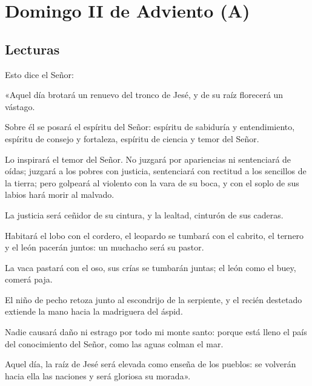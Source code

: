 \chapter{Domingo II de Adviento (A)}

\section{Lecturas}


 


\begin{scripture}
	
	Esto dice el Señor:
	
	«Aquel día brotará un renuevo del tronco de Jesé, y de su raíz florecerá un vástago.
	
	Sobre él se posará el espíritu del Señor: espíritu de sabiduría y entendimiento, espíritu de consejo y fortaleza, espíritu de ciencia y temor del Señor.
	
	Lo inspirará el temor del Señor. No juzgará por apariencias ni sentenciará de oídas; juzgará a los pobres con justicia, sentenciará con rectitud a los sencillos de la tierra; pero golpeará al violento con la vara de su boca, y con el soplo de sus labios hará morir al malvado.
	
	La justicia será ceñidor de su cintura, y la lealtad, cinturón de sus caderas.
	
	Habitará el lobo con el cordero, el leopardo se tumbará con el cabrito, el ternero y el león pacerán juntos: un muchacho será su pastor.
	
	La vaca pastará con el oso, sus crías se tumbarán juntas; el león como el buey, comerá paja.
	
	El niño de pecho retoza junto al escondrijo de la serpiente, y el recién destetado extiende la mano hacia la madriguera del áspid.
	
	Nadie causará daño ni estrago por todo mi monte santo: porque está lleno el país del conocimiento del Señor, como las aguas colman el mar.
	
	Aquel día, la raíz de Jesé será elevada como enseña de los pueblos: se volverán hacia ella las naciones y será gloriosa su morada».
\end{scripture}


